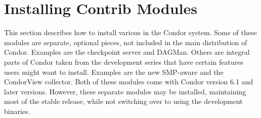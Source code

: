\section{\label{sec:Contrib-Install}Installing Contrib Modules}

This section describes how to install various 
in the Condor system.
Some of these modules are separate, optional pieces, not included in
the main distribution of Condor.
Examples are the checkpoint server and DAGMan.
Others are integral parts of Condor taken from the development series
that have certain features users might want to install.
Examples are the new SMP-aware  and the CondorView
collector.  
Both of these modules come with Condor version 6.1 and
later versions.
However, 
these separate modules may be installed,
maintaining most of the stable release,
while not
switching over to using the
development binaries.










